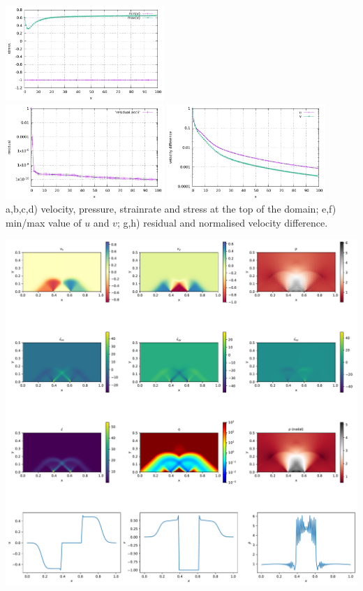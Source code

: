 \begin{center}
\includegraphics[width=6cm]{python_codes/fieldstone_08/results/rough/v_stats.pdf}\\
\includegraphics[width=6cm]{python_codes/fieldstone_08/results/rough/residual.pdf}
\includegraphics[width=6cm]{python_codes/fieldstone_08/results/rough/diff_uv.pdf}\\
{\captionfont a,b,c,d) velocity, pressure, strainrate and stress at the top of the domain; 
e,f) min/max value of $u$ and $v$;
g,h) residual and normalised velocity difference.}
\end{center}

\newpage
\includegraphics[width=16cm]{python_codes/fieldstone_08/results/rough/solution.pdf}


